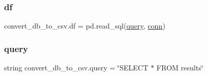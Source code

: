 \subsubsection{\texorpdfstring{df}{df}}
{\footnotesize\ttfamily convert\+\_\+db\+\_\+to\+\_\+csv.\+df = pd.\+read\+\_\+sql(\hyperlink{namespaceconvert__db__to__csv_a5d57a3f656148bd4ee88527913ded9dc}{query}, \hyperlink{namespaceconvert__db__to__csv_a9341f766302a5eb3bec8a9635d370dda}{conn})}

\mbox{\label{namespaceconvert__db__to__csv_a5d57a3f656148bd4ee88527913ded9dc}} 
\subsubsection{\texorpdfstring{query}{query}}
{\footnotesize\ttfamily string convert\+\_\+db\+\_\+to\+\_\+csv.\+query = \char`\"{}S\+E\+L\+E\+CT $\ast$ F\+R\+OM results\char`\"{}}


